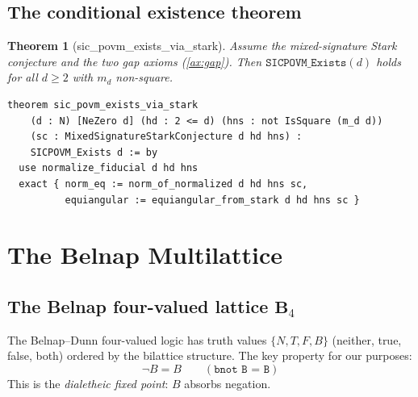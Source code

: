 \documentclass[12pt,a4paper]{article}
\newtheorem{theorem}{Theorem}[section]
\newcommand{\BFour}{\mathbf{B}_4}
\begin{document}
\subsection{The conditional existence theorem}
\begin{theorem}[sic\_povm\_exists\_via\_stark]
\label{thm:stark-sic}
Assume the mixed-signature Stark conjecture and the two gap axioms
(\ref{ax:gap}). Then $\texttt{SICPOVM\_Exists}(d)$ holds for all $d \geq 2$
with $m_d$ non-square.
\end{theorem}
\begin{lstlisting}
theorem sic_povm_exists_via_stark
    (d : N) [NeZero d] (hd : 2 <= d) (hns : not IsSquare (m_d d))
    (sc : MixedSignatureStarkConjecture d hd hns) :
    SICPOVM_Exists d := by
  use normalize_fiducial d hd hns
  exact { norm_eq := norm_of_normalized d hd hns sc,
          equiangular := equiangular_from_stark d hd hns sc }
\end{lstlisting}
\section{The Belnap Multilattice}
\label{sec:belnap}
\subsection{The Belnap four-valued lattice $\BFour$}
The Belnap--Dunn four-valued logic \cite{Belnap1977} has truth values
$\{N, T, F, B\}$ (neither, true, false, both) ordered by the bilattice
structure. The key property for our purposes:
\[
\neg B = B \qquad (\texttt{bnot B = B})
\]
This is the \emph{dialetheic fixed point}: $B$ absorbs negation.
\end{document}
